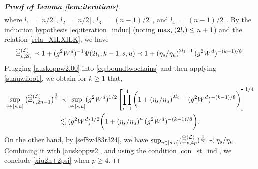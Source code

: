 \begin{proof}[\bf Proof of Lemma \ref{lem:iterations}]
\begin{equation}
\begin{split}
\end{split}
\end{equation}
where $l_1=\lceil n/2\rceil$, $l_2=\lfloor n/2\rfloor$, $l_3=\lceil (n-1)/2\rceil$, and $l_4=\lfloor (n-1)/2\rfloor$. 
By the induction hypothesis \eqref{eq:iteration_induc} (noting $\max_i\left({2l_i}\right)\le n+1$) and the relation \eqref{rela_XILXILK}, we have
\begin{align}\label{auskoppw2.00}
\widehat\Xi_{v,2l_i}^{(\mathcal L)} \prec 1+ (g^2 W^{d})^{-1} \Psi(2l_i,k-1;s,u) \prec 1+ \left({{\eta_s}/{\eta_u}}\right)^{2l_i-1} (g^2W^d)^{-(k-1)/8}.
\end{align}
Plugging \eqref{auskoppw2.00} into \eqref{eq:boundtwochains} and then applying \eqref{suauwiioo1}, we obtain for $k\ge 1$ that, 
\begin{align}\label{auskoppw2}
\sup_{v\in[s,u]}\big(\widehat\Xi^{({\mathcal L})}_{v, 2n-1}\big)^{\frac{1}{2}}&\prec  \sup_{v\in[s,u]} (g^2W^d)^{1/2}\left[\prod_{i=1}^4\bigg(1+ \left({{\eta_s}/{\eta_u}}\right)^{2l_i-1} (g^2W^d)^{-(k-1)/8}\bigg)\right]^{1/4} \nonumber\\
&\lesssim (g^2W^d)^{1/2}\bigg(1+ \left({{\eta_s}/{\eta_u}}\right)^{n} (g^2W^d)^{-(k-1)/8}\bigg).
\end{align}
On the other hand, by \eqref{sef8w483r324}, we have 
\(\sup_{v\in[s,u]} (\widehat\Xi^{(\mathcal L)}_{v, 4p})^{\frac{1}{4p}} \prec {\eta_s}/{\eta_u} .\)
Combining it with \eqref{auskoppw2}, and using the condition \eqref{con_st_ind}, we conclude \eqref{xiu2n+2psi} when $p\ge 4$.  
\end{proof}  



